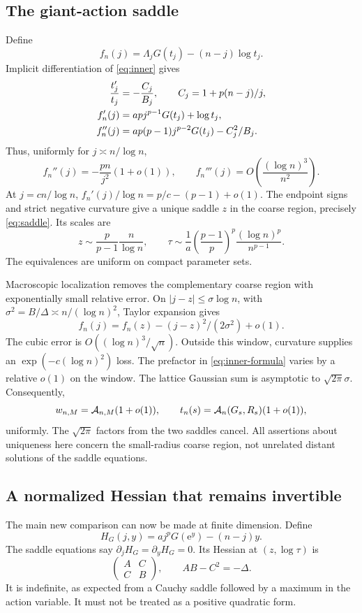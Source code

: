 \documentclass[11pt,a4paper]{article}
\numberwithin{equation}{section}
\theoremstyle{definition}
\theoremstyle{remark}
\newcommand{\ee}{\mathrm e}\newcommand{\dd}{\mathrm d}
\begin{document}
\subsection{The giant-action saddle}
Define
\[
 f_n(j)=\Lambda_jG(t_j)-(n-j)\log t_j.
\]
Implicit differentiation of \eqref{eq:inner} gives
\begin{align}
 \frac{t_j'}{t_j}&=-\frac{C_j}{B_j},\qquad
 C_j=1+p(n-j)/j,\notag\\
 f_n'(j)&=apj^{p-1}G(t_j)+\log t_j,\notag\\
 f_n''(j)&=ap(p-1)j^{p-2}G(t_j)-C_j^2/B_j.
 \label{eq:derivatives}
\end{align}
Thus, uniformly for $j\asymp n/\log n$,
\begin{equation}
 f_n''(j)=-\frac{pn}{j^2}(1+o(1)),\qquad
 f_n'''(j)=O\left(\frac{(\log n)^3}{n^2}\right).
 \label{eq:curvature}
\end{equation}
At $j=c n/\log n$,
$f_n'(j)/\log n=p/c-(p-1)+o(1)$. The endpoint signs and strict
negative curvature give a unique saddle $z$ in the coarse region, precisely
\eqref{eq:saddle}. Its scales are
\begin{equation}
 z\sim\frac p{p-1}\frac n{\log n},\qquad
 \tau\sim\frac1a\left(\frac{p-1}{p}\right)^p
             \frac{(\log n)^p}{n^{p-1}}.
 \label{eq:scales}
\end{equation}
The equivalences are uniform on compact parameter sets.

Macroscopic localization removes the complementary coarse region with
exponentially small relative error. On $|j-z|\le\sigma\log n$, with
$\sigma^2=B/\Delta\asymp n/(\log n)^2$, Taylor expansion gives
\[
 f_n(j)=f_n(z)-(j-z)^2/(2\sigma^2)+o(1).
\]
The cubic error is $O((\log n)^3/\sqrt n)$. Outside this window, curvature
supplies an $\exp(-c(\log n)^2)$ loss. The prefactor in
\eqref{eq:inner-formula} varies by a relative $o(1)$ on the window.
The lattice Gaussian sum is asymptotic to $\sqrt{2\pi}\sigma$.
Consequently,
\begin{equation}
 w_{n,M}=\mathcal A_{n,M}(1+o(1)),\qquad
 t_n(s)=\mathcal A_n(G_s,R_s)(1+o(1)),
 \label{eq:saddle-uniform}
\end{equation}
uniformly. The $\sqrt{2\pi}$ factors from the two saddles cancel.
All assertions about uniqueness here concern the small-radius coarse region,
not unrelated distant solutions of the saddle equations.

\subsection{A normalized Hessian that remains invertible}
The main new comparison can now be made at finite dimension. Define
\begin{equation}
 H_G(j,y)=a j^pG(\ee^y)-(n-j)y.
 \label{eq:H}
\end{equation}
The saddle equations say $\partial_jH_G=\partial_yH_G=0$. Its Hessian at
$(z,\log\tau)$ is
\[
 \begin{pmatrix} A&C\\ C&B\end{pmatrix},\qquad AB-C^2=-\Delta.
\]
It is indefinite, as expected from a Cauchy saddle followed by a maximum
in the action variable. It must not be treated as a positive quadratic form.
\end{document}
